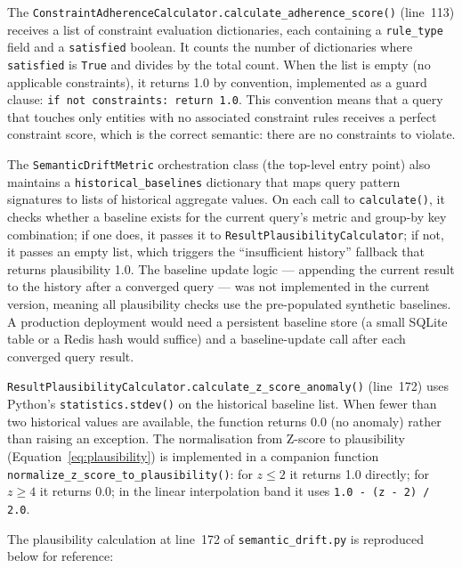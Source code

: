 \documentclass[12pt,a4paper]{report}
\begin{document}
The \texttt{ConstraintAdherenceCalculator.calculate\_adherence\_score()} (line~113) receives a list of constraint evaluation dictionaries, each containing a \texttt{rule\_type} field and a \texttt{satisfied} boolean. It counts the number of dictionaries where \texttt{satisfied} is \texttt{True} and divides by the total count. When the list is empty (no applicable constraints), it returns 1.0 by convention, implemented as a guard clause: \texttt{if not constraints: return 1.0}. This convention means that a query that touches only entities with no associated constraint rules receives a perfect constraint score, which is the correct semantic: there are no constraints to violate.

The \texttt{SemanticDriftMetric} orchestration class (the top-level entry point) also maintains a \texttt{historical\_baselines} dictionary that maps query pattern signatures to lists of historical aggregate values. On each call to \texttt{calculate()}, it checks whether a baseline exists for the current query's metric and group-by key combination; if one does, it passes it to \texttt{ResultPlausibilityCalculator}; if not, it passes an empty list, which triggers the ``insufficient history'' fallback that returns plausibility 1.0. The baseline update logic — appending the current result to the history after a converged query — was not implemented in the current version, meaning all plausibility checks use the pre-populated synthetic baselines. A production deployment would need a persistent baseline store (a small SQLite table or a Redis hash would suffice) and a baseline-update call after each converged query result.

\texttt{ResultPlausibilityCalculator.calculate\_z\_score\_anomaly()} (line~172) uses Python's \texttt{statistics.stdev()} on the historical baseline list. When fewer than two historical values are available, the function returns 0.0 (no anomaly) rather than raising an exception. The normalisation from Z-score to plausibility (Equation~\ref{eq:plausibility}) is implemented in a companion function \texttt{normalize\_z\_score\_to\_plausibility()}: for $z \leq 2$ it returns 1.0 directly; for $z \geq 4$ it returns 0.0; in the linear interpolation band it uses \texttt{1.0 - (z - 2) / 2.0}.

The plausibility calculation at line~172 of \texttt{semantic\_drift.py} is reproduced below for reference:
\end{document}
